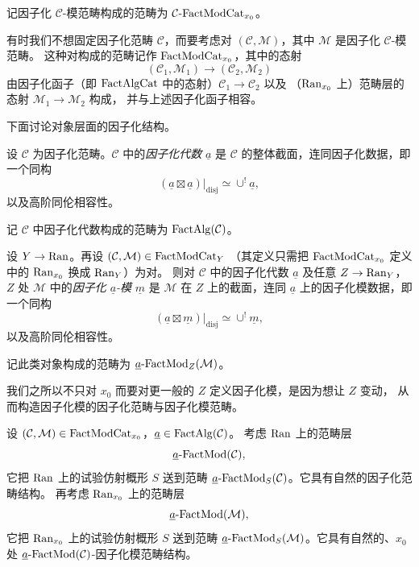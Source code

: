 记因子化 $\mathcal{C}$-模范畴构成的范畴为
$\mathcal{C}\text{-}\mathrm{FactModCat}_{x_0}$。

\begin{remark}
\label{rem:pairs}
有时我们不想固定因子化范畴 $\mathcal{C}$，而要考虑对
$(\mathcal{C},\mathcal{M})$，其中 $\mathcal{M}$ 是因子化 $\mathcal{C}$-模范畴。
这种对构成的范畴记作 $\mathrm{FactModCat}_{x_0}$，其中的态射
\[
(\mathcal{C}_1,\mathcal{M}_1)\to(\mathcal{C}_2,\mathcal{M}_2)
\]
由因子化函子（即 $\mathrm{FactAlgCat}$ 中的态射）$\mathcal{C}_1\to \mathcal{C}_2$ 以及
（$\mathrm{Ran}_{x_0}$ 上）范畴层的态射 $\mathcal{M}_1\to \mathcal{M}_2$ 构成，
并与上述因子化函子相容。
\end{remark}

下面讨论对象层面的因子化结构。

\begin{definition}
\label{def:fact-alg}
设 $\mathcal{C}$ 为因子化范畴。$\mathcal{C}$ 中的\emph{因子化代数} $\underline{a}$
是 $\mathcal{C}$ 的整体截面，连同因子化数据，即一个同构
\[
(\underline{a}\boxtimes \underline{a})|_{\mathrm{disj}}
\simeq \cup^{!}\underline{a},
\]
以及高阶同伦相容性。
\end{definition}

记 $\mathcal{C}$ 中因子化代数构成的范畴为 $\mathrm{FactAlg}(\mathcal{C})$。

\begin{definition}
\label{def:fact-mod}
设 $Y\to \mathrm{Ran}$。再设 $(\mathcal{C},\mathcal{M})\in \mathrm{FactModCat}_Y$
（其定义只需把 $\mathrm{FactModCat}_{x_0}$ 定义中的 $\mathrm{Ran}_{x_0}$ 换成 $\mathrm{Ran}_Y$）为对。
则对 $\mathcal{C}$ 中的因子化代数 $\underline{a}$ 及任意 $Z\to \mathrm{Ran}_Y$，
$Z$ 处 $\mathcal{M}$ 中的\emph{因子化 $\underline{a}$-模} $\underline{m}$
是 $\mathcal{M}$ 在 $Z$ 上的截面，连同 $\underline{a}$ 上的因子化模数据，即一个同构
\[
(\underline{a}\boxtimes \underline{m})|_{\mathrm{disj}}
\simeq \cup^{!}\underline{m},
\]
以及高阶同伦相容性。
\end{definition}

记此类对象构成的范畴为
$\underline{a}\text{-}\mathrm{FactMod}_{Z}(\mathcal{M})$。

我们之所以不只对 $x_0$ 而要对更一般的 $Z$ 定义因子化模，是因为想让 $Z$ 变动，
从而构造因子化模的因子化范畴与因子化模范畴。

\begin{definition}
\label{def:fact-mod-sheaf}
设 $(\mathcal{C},\mathcal{M})\in \mathrm{FactModCat}_{x_0}$，$\underline{a}\in \mathrm{FactAlg}(\mathcal{C})$。
考虑 $\mathrm{Ran}$ 上的范畴层
\[
\underline{a}\text{-}\mathrm{FactMod}(\mathcal{C}),
\]
它把 $\mathrm{Ran}$ 上的试验仿射概形 $S$ 送到范畴
$\underline{a}\text{-}\mathrm{FactMod}_{S}(\mathcal{C})$。它具有自然的因子化范畴结构。
再考虑 $\mathrm{Ran}_{x_0}$ 上的范畴层
\[
\underline{a}\text{-}\mathrm{FactMod}(\mathcal{M}),
\]
它把 $\mathrm{Ran}_{x_0}$ 上的试验仿射概形 $S$ 送到范畴
$\underline{a}\text{-}\mathrm{FactMod}_{S}(\mathcal{M})$。它具有自然的、$x_0$ 处
$\underline{a}\text{-}\mathrm{FactMod}(\mathcal{C})$-因子化模范畴结构。
\end{definition}

